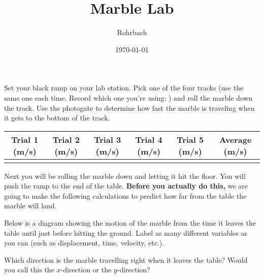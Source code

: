 \documentclass[10pt]{exam}
\title{Marble Lab}
\author{Rohrbach}
\date{\today}
\begin{document}
\maketitle

\begin{questions}
  
  \question
    Set your black ramp on your lab station.  Pick one of the four tracks (use the same one each time.  Record which one you're using: \fillin[][10em]) and roll the marble down the track.  Use the photogate to determine how fast the marble is traveling when it gets to the bottom of the track.

    \begin{tabular}{|*5{c|}|c|}
      \hline
      Trial 1 (m/s)	&
      Trial 2 (m/s)	&
      Trial 3 (m/s)	&
      Trial 4 (m/s)	&
      Trial 5 (m/s)	&
      Average (m/s) \\
      \hline
      &&&&& \\[1.5em]
      \hline
  
    \end{tabular}

  
  \begin{EnvUplevel}
    Next you will be rolling the marble down and letting it hit the floor.  You will push the ramp to the end of the table.  {\bf Before you actually do this,} we are going to make the following calculations to predict how far from the table the marble will land.
  \end{EnvUplevel}
  	
  \question
    Below is a diagram showing the motion of the marble from the time it leaves the table until just before hitting the ground.  Label as many different variables as you can (such as displacement, time, velocity, etc.).
    
  
  \question
    Which direction is the marble travelling right when it leaves the table?  Would you call this the $x$-direction or the $y$-direction?
    \vspace{3em}
  

\end{questions}
\end{document}
